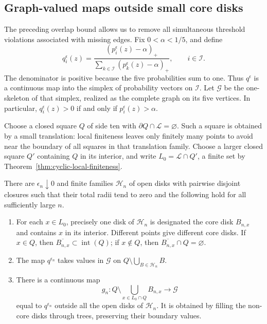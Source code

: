 \subsection{Graph-valued maps outside small core disks}

The preceding overlap bound allows us to remove all simultaneous
threshold violations associated with missing edges.  Fix
$0<\alpha<1/5$, and define
\begin{equation}
 q_i^\epsilon(z)=
 \frac{(p_i^\epsilon(z)-\alpha)_+}
      {\sum_{k\in\mathcal I}(p_k^\epsilon(z)-\alpha)_+},
 \qquad i\in\mathcal I.
 \label{eq:source-22}
\end{equation}
The denominator is positive because the five probabilities sum to one.
Thus $q^\epsilon$ is a continuous map into the simplex of probability
vectors on $\mathcal I$.  Let $\mathscr G$ be the one-skeleton of that
simplex, realized as the complete graph on its five vertices.  In
particular, $q_i^\epsilon(z)>0$ if and only if
$p_i^\epsilon(z)>\alpha$.

Choose a closed square $Q$ of side ten with
$\partial Q\cap\mathcal L=\varnothing$.  Such a square is obtained by
a small translation: local finiteness leaves only finitely many points
to avoid near the boundary of all squares in that translation family.
Choose a larger closed square $Q'$ containing $Q$ in its interior, and
write $L_0=\mathcal L\cap Q'$, a finite set by
Theorem~\ref{thm:cyclic-local-finiteness}.

\begin{lemma}
\label{lem:interfaces-hole-maps}
There are $\epsilon_n\downarrow0$ and finite families $\mathcal H_n$
of open disks with pairwise disjoint closures such that their total
radii tend to zero and the following hold for all sufficiently large
$n$.
\begin{enumerate}
\item For each $x\in L_0$, precisely one disk of $\mathcal H_n$ is
designated the core disk $B_{n,x}$ and contains $x$ in its interior.
Different points give different core disks.  If $x\in Q$, then
$\overline{B_{n,x}}\subset\operatorname{int}(Q)$; if $x\notin Q$, then
$\overline{B_{n,x}}\cap Q=\varnothing$.
\item The map $q^{\epsilon_n}$ takes values in $\mathscr G$ on
$Q\setminus\bigcup_{B\in\mathcal H_n}B$.
\item There is a continuous map
\begin{equation}
 g_n:Q\setminus\bigcup_{x\in L_0\cap Q}B_{n,x}
       \longrightarrow\mathscr G
 \label{eq:source-23}
\end{equation}
equal to $q^{\epsilon_n}$ outside all the open disks of
$\mathcal H_n$.  It is obtained by filling the non-core disks through
trees, preserving their boundary values.
\end{enumerate}
\end{lemma}

